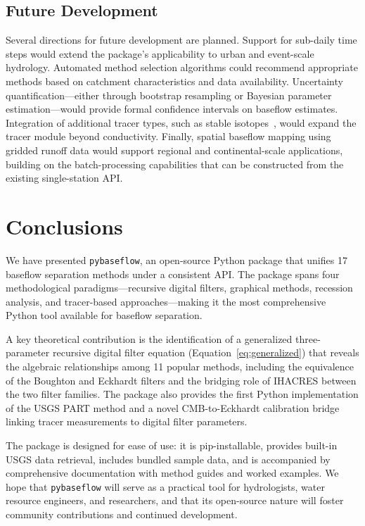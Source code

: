\documentclass[hydrology,article,submit,pdftex,moreauthors]{Definitions/mdpi}
\begin{document}
\subsection{Future Development}
\label{sec:future}

Several directions for future development are planned. Support for sub-daily time steps would extend the package's applicability to urban and event-scale hydrology. Automated method selection algorithms could recommend appropriate methods based on catchment characteristics and data availability. Uncertainty quantification---either through bootstrap resampling or Bayesian parameter estimation---would provide formal confidence intervals on baseflow estimates. Integration of additional tracer types, such as stable isotopes~\cite{Klaus2013}, would expand the tracer module beyond conductivity. Finally, spatial baseflow mapping using gridded runoff data would support regional and continental-scale applications, building on the batch-processing capabilities that can be constructed from the existing single-station API.

\section{Conclusions}
\label{sec:conclusions}

We have presented \texttt{pybaseflow}, an open-source Python package that unifies 17 baseflow separation methods under a consistent API. The package spans four methodological paradigms---recursive digital filters, graphical methods, recession analysis, and tracer-based approaches---making it the most comprehensive Python tool available for baseflow separation.

A key theoretical contribution is the identification of a generalized three-parameter recursive digital filter equation (Equation~\ref{eq:generalized}) that reveals the algebraic relationships among 11 popular methods, including the equivalence of the Boughton and Eckhardt filters and the bridging role of IHACRES between the two filter families. The package also provides the first Python implementation of the USGS PART method and a novel CMB-to-Eckhardt calibration bridge linking tracer measurements to digital filter parameters.

The package is designed for ease of use: it is pip-installable, provides built-in USGS data retrieval, includes bundled sample data, and is accompanied by comprehensive documentation with method guides and worked examples. We hope that \texttt{pybaseflow} will serve as a practical tool for hydrologists, water resource engineers, and researchers, and that its open-source nature will foster community contributions and continued development.
\end{document}
